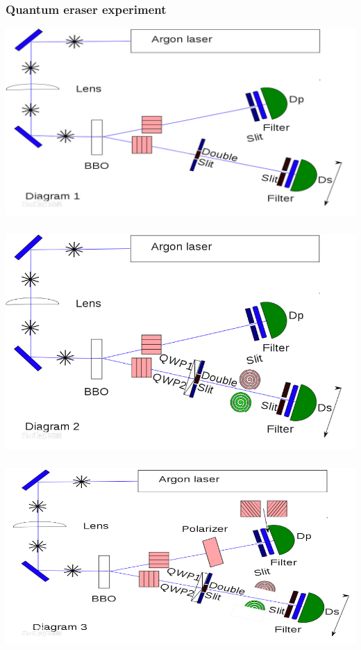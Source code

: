 \begin{frame}
    \frametitle{Quantum eraser experiment}
    \begin{center}
        \includegraphics[width=1.0\textwidth]{figs/chachuexp.png} \\
    \end{center} 
\end{frame}

\begin{frame}
    \frametitle{}
    \begin{center}
        \includegraphics[width=1.0\textwidth]{figs/chachuexp_2.png} \\
    \end{center} 
\end{frame}

\begin{frame}
    \frametitle{}
    \begin{center}
        \includegraphics[width=1.0\textwidth]{figs/chachuexp_3.png} \\
    \end{center} 
\end{frame}

